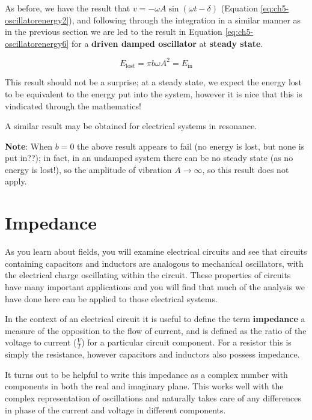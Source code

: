 \documentclass[
]{book}
\begin{document}
As before, we have the result that \(v = -\omega A \sin(\omega t - \delta)\) (Equation \eqref{eq:ch5-oscillatorenergy2}), and following through the integration in a similar manner as in the previous section we are led to the result in Equation \eqref{eq:ch5-oscillatorenergy6} for a \textbf{driven damped oscillator} at \textbf{steady state}.

\begin{equation}
E_{\mathrm{lost}}  = \pi b \omega A^2= E_{\mathrm{in}}
\label{eq:ch5-oscillatorenergy6}
\end{equation}

This result should not be a surprise; at a steady state, we expect the energy lost to be equivalent to the energy put into the system, however it is nice that this is vindicated through the mathematics!

A similar result may be obtained for electrical systems in resonance.

\textbf{Note}: When \(b = 0\) the above result appears to fail (no energy is lost, but none is put in??); in fact, in an undamped system there can be no steady state (as no energy is lost!), so the amplitude of vibration \(A \rightarrow \infty\), so this result does not apply.

\hypertarget{sec:ch5-impedance}{%
\section{Impedance}\label{sec:ch5-impedance}}

As you learn about fields, you will examine electrical circuits and see that circuits containing capacitors and inductors are analogous to mechanical oscillators, with the electrical charge oscillating within the circuit. These properties of circuits have many important applications and you will find that much of the analysis we have done here can be applied to those electrical systems.

In the context of an electrical circuit it is useful to define the term \textbf{impedance} a measure of the opposition to the flow of current, and is defined as the ratio of the voltage to current (\(\frac{V}{I}\)) for a particular circuit component. For a resistor this is simply the resistance, however capacitors and inductors also possess impedance.

It turns out to be helpful to write this impedance as a complex number with components in both the real and imaginary plane. This works well with the complex representation of oscillations and naturally takes care of any differences in phase of the current and voltage in different components.
\end{document}
